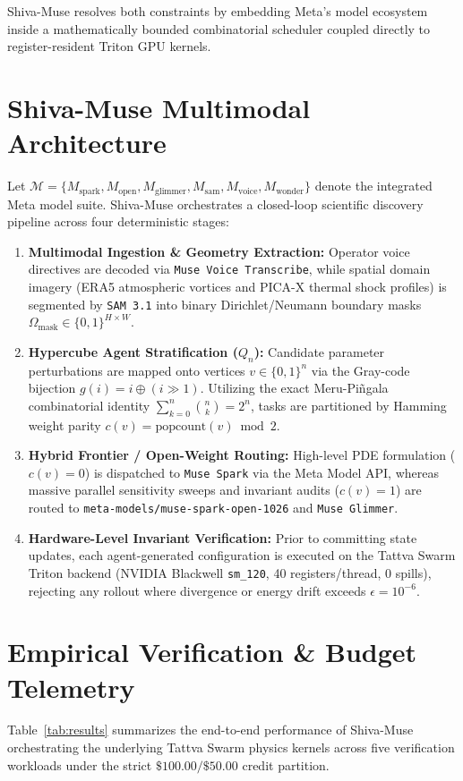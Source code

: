 \documentclass[10pt,twocolumn,letterpaper]{article}
\begin{document}
Shiva-Muse resolves both constraints by embedding Meta's model ecosystem inside a mathematically bounded combinatorial scheduler coupled directly to register-resident Triton GPU kernels.

\section{Shiva-Muse Multimodal Architecture}
Let $\mathcal{M} = \{M_{\text{spark}}, M_{\text{open}}, M_{\text{glimmer}}, M_{\text{sam}}, M_{\text{voice}}, M_{\text{wonder}}\}$ denote the integrated Meta model suite. Shiva-Muse orchestrates a closed-loop scientific discovery pipeline across four deterministic stages:

\begin{enumerate}
    \item \textbf{Multimodal Ingestion \& Geometry Extraction:} Operator voice directives are decoded via \texttt{Muse Voice Transcribe}, while spatial domain imagery (ERA5 atmospheric vortices and PICA-X thermal shock profiles) is segmented by \texttt{SAM 3.1} into binary Dirichlet/Neumann boundary masks $\Omega_{\text{mask}} \in \{0,1\}^{H \times W}$.
    \item \textbf{Hypercube Agent Stratification ($Q_n$):} Candidate parameter perturbations are mapped onto vertices $v \in \{0,1\}^n$ via the Gray-code bijection $g(i) = i \oplus (i \gg 1)$. Utilizing the exact Meru-Pi\~{n}gala combinatorial identity $\sum_{k=0}^n \binom{n}{k} = 2^n$, tasks are partitioned by Hamming weight parity $c(v) = \text{popcount}(v) \bmod 2$.
    \item \textbf{Hybrid Frontier / Open-Weight Routing:} High-level PDE formulation ($c(v)=0$) is dispatched to \texttt{Muse Spark} via the Meta Model API, whereas massive parallel sensitivity sweeps and invariant audits ($c(v)=1$) are routed to \texttt{meta-models/muse-spark-open-1026} and \texttt{Muse Glimmer}.
    \item \textbf{Hardware-Level Invariant Verification:} Prior to committing state updates, each agent-generated configuration is executed on the Tattva Swarm Triton backend (NVIDIA Blackwell \texttt{sm\_120}, 40 registers/thread, 0 spills), rejecting any rollout where divergence or energy drift exceeds $\epsilon = 10^{-6}$.
\end{enumerate}

\section{Empirical Verification \& Budget Telemetry}
Table~\ref{tab:results} summarizes the end-to-end performance of Shiva-Muse orchestrating the underlying Tattva Swarm physics kernels across five verification workloads under the strict $\$100.00 / \$50.00$ credit partition.
\end{document}
